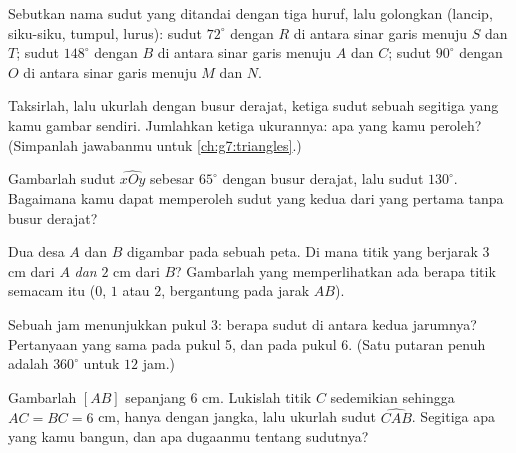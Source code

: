 \begin{exercise}[$\star$]\label{exo:g6:lines:7}
Sebutkan nama sudut yang ditandai dengan tiga huruf, lalu golongkan
(lancip, siku-siku, tumpul, lurus): sudut $72^\circ$ dengan  $R$ di antara sinar garis menuju $S$ dan $T$; sudut $148^\circ$
dengan  $B$ di antara sinar garis menuju $A$ dan $C$; sudut
$90^\circ$ dengan  $O$ di antara sinar garis menuju $M$ dan $N$.
\end{exercise}

\begin{exercise}[$\star$]\label{exo:g6:lines:8}
Taksirlah, lalu ukurlah dengan busur derajat, ketiga sudut sebuah
segitiga yang kamu gambar sendiri. Jumlahkan ketiga ukurannya: apa
yang kamu peroleh? (Simpanlah jawabanmu untuk \cref{ch:g7:triangles}.)
\end{exercise}

\begin{exercise}[$\star$]\label{exo:g6:lines:9}
Gambarlah sudut $\widehat{xOy}$ sebesar $65^\circ$ dengan busur
derajat, lalu sudut $130^\circ$. Bagaimana kamu dapat memperoleh sudut
yang kedua dari yang pertama tanpa busur derajat?
\end{exercise}

\begin{exercise}[$\star\star$]\label{exo:g6:lines:10}
Dua desa $A$ dan $B$ digambar pada sebuah peta. Di mana titik yang
berjarak $3$ cm dari $A$ \emph{dan} $2$ cm dari $B$? Gambarlah yang
memperlihatkan ada berapa titik semacam itu ($0$, $1$ atau $2$,
bergantung pada jarak $AB$).
\end{exercise}

\begin{exercise}[$\star\star$]\label{exo:g6:lines:11}
Sebuah jam menunjukkan pukul 3: berapa sudut di antara kedua jarumnya?
Pertanyaan yang sama pada pukul 5, dan pada pukul 6. (Satu putaran
penuh adalah $360^\circ$ untuk $12$ jam.)
\end{exercise}

\begin{exercise}[$\star\star\star$]\label{exo:g6:lines:12}
Gambarlah  $[AB]$ sepanjang $6$ cm. Lukislah titik $C$
sedemikian sehingga $AC = BC = 6$ cm, hanya dengan jangka, lalu ukurlah
sudut $\widehat{CAB}$. Segitiga apa yang kamu bangun, dan apa dugaanmu
tentang sudutnya?
\end{exercise}

